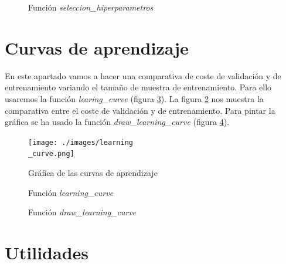 \documentclass[6pt]{../../shared/AiTex}
\begin{document}
\begin{figure}[H]
    \centering
    
    \caption{Función \textit{seleccion\_hiperparametros}}
    \label{fig:seleccion_hiperparametros}
\end{figure}


\section{Curvas de aprendizaje}

En este apartado vamos a hacer una comparativa de coste de validación y de entrenamiento variando el tamaño de muestra de entrenamiento. Para ello usaremos la función \textit{learing\_curve} (figura \ref{fig:learning_curve}). La figura \ref{fig:curvas_aprendizaje_plot} nos muestra la comparativa entre el coste de validación y de entrenamiento. Para pintar la gráfica se ha usado la función \textit{draw\_learning\_curve} (figura \ref{fig:draw_learning_curve}).

\begin{figure}[H]
    \centering
    \texttt{[image: ./images/learning\\\_curve.png]}
    \caption{Gráfica de las curvas de aprendizaje}
    \label{fig:curvas_aprendizaje_plot}
\end{figure}

\begin{figure}[H]
    \centering
    
    \caption{Función \textit{learning\_curve}}
    \label{fig:learning_curve}
\end{figure}

\begin{figure}[H]
    \centering
    
    \caption{Función \textit{draw\_learning\_curve}}
    \label{fig:draw_learning_curve}
\end{figure}


\section{Utilidades}
\end{document}
